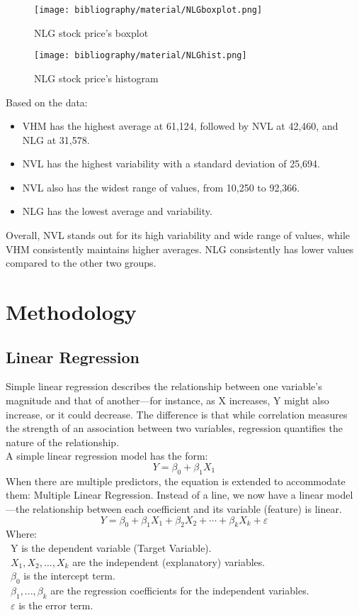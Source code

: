 \documentclass{ieeeojies}
\begin{document}
	\begin{figure}[H]
		\centering
		\begin{minipage}{0.23\textwidth}
			\centering
			\texttt{[image: bibliography/material/NLGboxplot.png]}
			\caption{NLG stock price's boxplot}
			\label{fig:1}
		\end{minipage}
		\hfill
		\begin{minipage}{0.23\textwidth}
			\centering
			\texttt{[image: bibliography/material/NLGhist.png]}
			\caption{NLG stock price's histogram}
			\label{fig:2}
		\end{minipage}
	\end{figure}
	\newpage
	Based on the data:
	\begin{itemize}
		\item VHM has the highest average at 61,124, followed by NVL at 42,460, and NLG at
		31,578.
		\item NVL has the highest variability with a standard deviation of 25,694.
		\item NVL also has the widest range of values, from 10,250 to 92,366.
		\item NLG has the lowest average and variability.
	\end{itemize}
	Overall, NVL stands out for its high variability and wide range of values, while VHM consistently maintains higher averages. NLG consistently has lower values compared to the other two groups.
	
	
	\section{Methodology}
	\subsection{Linear Regression}
	Simple linear regression describes the relationship between one variable's magnitude and that of another—for instance, as X increases, Y might also increase, or it could decrease. The difference is that while correlation measures the strength of an association between two variables, regression quantifies the nature of the relationship. \cite{b7}\\
	A simple linear regression model has the form:
	\[Y=\beta_0+\beta_1X_1\]
	When there are multiple predictors, the equation is extended to accommodate them: Multiple Linear Regression. Instead of a line, we now have a linear model—the relationship between each coefficient and its variable (feature) is linear.
	\[Y=\beta_0+\beta_1 X_1+\beta_2 X_2+\cdots+\beta_k X_k+\varepsilon\]
	Where:\\
	\indent\textbullet\ Y is the dependent variable (Target Variable).\\
	\indent\textbullet\ \(X_1, X_2, \ldots, X_k\) are the independent (explanatory) variables.\\
	\indent\textbullet\ \(\beta_0\) is the intercept term.\\
	\indent\textbullet\ \(\beta_1,..., \beta_k\) are the regression coefficients for the independent variables.\\
	\indent\textbullet\ \(\varepsilon\) is the error term.
	
\end{document}
